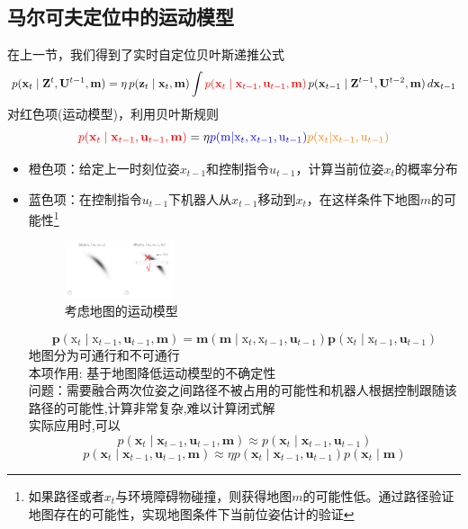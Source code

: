 \documentclass[../main.tex]{subfiles}
\begin{document}
\subsection{马尔可夫定位中的运动模型}
        在上一节，我们得到了实时自定位贝叶斯递推公式
        \[
        p(\mathbf{x}_t \mid \mathbf{Z}^{t}, \mathbf{U}^{t-1}, \mathbf{m})
        = \eta \, p(\mathbf{z}_t \mid \mathbf{x}_t, \mathbf{m})
        \int \textcolor{red}{p(\mathbf{x}_t \mid \mathbf{x}_{t-1}, \mathbf{u}_{t-1}, \mathbf{m})}
        \, p(\mathbf{x}_{t-1} \mid \mathbf{Z}^{t-1}, \mathbf{U}^{t-2}, \mathbf{m})
        \, d\mathbf{x}_{t-1}
        \]
        对红色项(运动模型)，利用贝叶斯规则
        $$\textcolor{red}{p(\mathbf{x}_t \mid \mathbf{x}_{t-1}, \mathbf{u}_{t-1}, \mathbf{m})}=\eta     \textcolor{blue}{p(\mathrm{m}|\mathrm{x}_t,\mathrm{x}_{t-1},\mathrm{u}_{t-1})}\textcolor{orange}{p(\mathrm{x}_t|\mathrm{x}_{t-1},\mathrm{u}_{t-1})}$$
        \begin{itemize}
            \item 橙色项：给定上一时刻位姿$x_{t-1}$和控制指令$u_{t-1}$，计算当前位姿$x_{t}$的概率分布
            \item 蓝色项：在控制指令$u_{t-1}$下机器人从$x_{t-1}$移动到$x_{t}$，在这样条件下地图$m$的可能性\footnote{如果路径或者$x_t$与环境障碍物碰撞，则获得地图$m$的可能性低。通过路径验证地图存在的可能性，实现地图条件下当前位姿估计的验证}
            \begin{figure}[H]
                \centering
                \includegraphics[width=0.3\textwidth]{images/map.png}
                \caption{考虑地图的运动模型}
            \end{figure}
            {\small\kaishu 
            $$ \mathbf{p}\left( {{\mathrm{x}}_{t} \mid  {\mathrm{x}}_{t - 1},{\mathbf{u}}_{t - 1},\mathbf{m}}\right)  = \mathbf{m}\left( {\mathbf{m} \mid  {\mathrm{x}}_{t},{\mathrm{x}}_{t - 1},{\mathbf{u}}_{t - 1}}\right) \mathbf{p}\left( {{\mathrm{x}}_{t} \mid  {\mathrm{x}}_{t - 1},{\mathbf{u}}_{t - 1}}\right)$$
            地图分为可通行和不可通行\\
            本项作用: 基于地图降低运动模型的不确定性\\
            问题：需要融合两次位姿之间路径不被占用的可能性和机器人根据控制跟随该路径的可能性,计算非常复杂,难以计算闭式解\\
            实际应用时,可以
            $$ p\left( {{\mathbf{x}}_{t} \mid  {\mathbf{x}}_{t - 1},{\mathbf{u}}_{t - 1},\mathbf{m}}\right)  \approx  p\left( {{\mathbf{x}}_{t} \mid  {\mathbf{x}}_{t - 1},{\mathbf{u}}_{t - 1}}\right) $$
            $$ p\left( {{\mathbf{x}}_{t} \mid  {\mathbf{x}}_{t - 1},{\mathbf{u}}_{t - 1},\mathbf{m}}\right)  \approx  {\eta p}\left( {{\mathbf{x}}_{t} \mid  {\mathbf{x}}_{t - 1},{\mathbf{u}}_{t - 1}}\right) p\left( {{\mathbf{x}}_{t} \mid  \mathbf{m}}\right) $$
            }
        \end{itemize}
\end{document}
